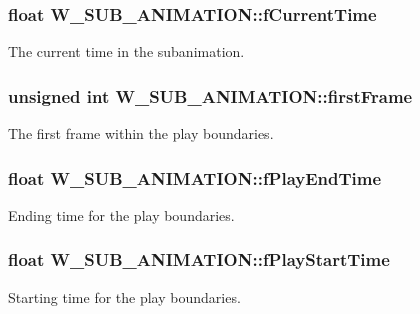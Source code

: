 \subsubsection[{\texorpdfstring{f\+Current\+Time}{fCurrentTime}}]{\setlength{\rightskip}{0pt plus 5cm}float W\+\_\+\+S\+U\+B\+\_\+\+A\+N\+I\+M\+A\+T\+I\+O\+N\+::f\+Current\+Time}\hypertarget{struct_w___s_u_b___a_n_i_m_a_t_i_o_n_ae6866df11b272a2a1928d54165ef2824}{}\label{struct_w___s_u_b___a_n_i_m_a_t_i_o_n_ae6866df11b272a2a1928d54165ef2824}
The current time in the subanimation. 
\subsubsection[{\texorpdfstring{first\+Frame}{firstFrame}}]{\setlength{\rightskip}{0pt plus 5cm}unsigned int W\+\_\+\+S\+U\+B\+\_\+\+A\+N\+I\+M\+A\+T\+I\+O\+N\+::first\+Frame}\hypertarget{struct_w___s_u_b___a_n_i_m_a_t_i_o_n_a32f726d022afd30cff9b7cae9259cafa}{}\label{struct_w___s_u_b___a_n_i_m_a_t_i_o_n_a32f726d022afd30cff9b7cae9259cafa}
The first frame within the play boundaries. 
\subsubsection[{\texorpdfstring{f\+Play\+End\+Time}{fPlayEndTime}}]{\setlength{\rightskip}{0pt plus 5cm}float W\+\_\+\+S\+U\+B\+\_\+\+A\+N\+I\+M\+A\+T\+I\+O\+N\+::f\+Play\+End\+Time}\hypertarget{struct_w___s_u_b___a_n_i_m_a_t_i_o_n_aab134456793deb3cd3b1f0689f3617ef}{}\label{struct_w___s_u_b___a_n_i_m_a_t_i_o_n_aab134456793deb3cd3b1f0689f3617ef}
Ending time for the play boundaries. 
\subsubsection[{\texorpdfstring{f\+Play\+Start\+Time}{fPlayStartTime}}]{\setlength{\rightskip}{0pt plus 5cm}float W\+\_\+\+S\+U\+B\+\_\+\+A\+N\+I\+M\+A\+T\+I\+O\+N\+::f\+Play\+Start\+Time}\hypertarget{struct_w___s_u_b___a_n_i_m_a_t_i_o_n_a34791417cc32bb2ddbe3f9d421e74d2d}{}\label{struct_w___s_u_b___a_n_i_m_a_t_i_o_n_a34791417cc32bb2ddbe3f9d421e74d2d}
Starting time for the play boundaries. 
